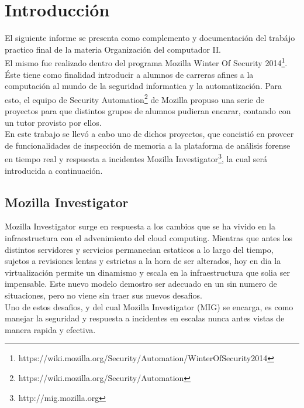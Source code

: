 \section{Introducción}

El siguiente informe se presenta como complemento y documentación del trabájo
practico final de la materia Organización del computador II.\\

El mismo fue realizado dentro del programa Mozilla Winter Of Security
2014\footnote{https://wiki.mozilla.org/Security/Automation/WinterOfSecurity2014}.
Éste tiene como finalidad introducir a alumnos de carreras afines a la
computación al mundo de la seguridad informatica y la automatización. Para
esto, el equipo de Security
Automation\footnote{https://wiki.mozilla.org/Security/Automation} de Mozilla
propuso una serie de proyectos para que distintos grupos de alumnos pudieran
encarar, contando con un tutor provisto por ellos.\\

En este trabajo se llevó a cabo uno de dichos proyectos, que concistió en
proveer de funcionalidades de inspección de memoria a la plataforma de análisis
forense en tiempo real y respuesta a incidentes Mozilla
Investigator\footnote{http://mig.mozilla.org}, la cual será introducida a
continuación.\\

\subsection{Mozilla Investigator}

Mozilla Investigator surge en respuesta a los cambios que se ha vivido en la
infraestructura con el advenimiento del cloud computing. Mientras que
antes los distintos servidores y servicios permanecian estaticos a lo largo del
tiempo, sujetos a revisiones lentas y estrictas a la hora de ser alterados, hoy
en dia la virtualización permite un dinamismo y escala en la infraestructura
que solia ser impensable. Este nuevo modelo demostro ser adecuado en un sin
numero de situaciones, pero no viene sin traer sus nuevos desafios.\\

Uno de estos desafios, y del cual Mozilla Investigator (MIG) se encarga, es
como manejar la seguridad y respuesta a incidentes en escalas nunca antes
vistas de manera rapida y efectiva.\\

